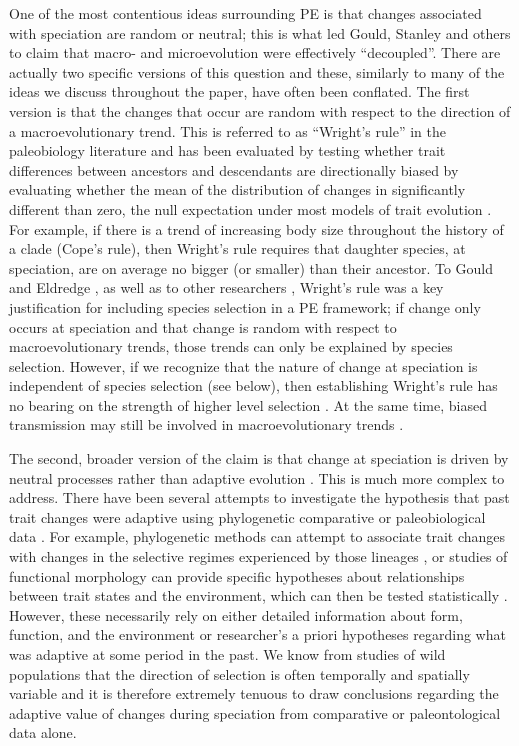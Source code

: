 One of the most contentious ideas surrounding PE is that changes associated with speciation are random or neutral; this is what led Gould, Stanley and others to claim that macro- and microevolution were effectively ``decoupled''. There are actually two specific versions of this question and these, similarly to many of the ideas we discuss throughout the paper, have often been conflated. The first version is that the changes that occur are random with respect to the direction of a macroevolutionary trend. This is referred to as ``Wright's rule'' in the paleobiology literature \citep{GouldEldredge1977} and has been evaluated by testing whether trait differences between ancestors and descendants are directionally biased by evaluating whether the mean of the distribution of changes in significantly different than zero, the null expectation under most models of trait evolution \citep{Wagner1996, Wagner2001}. For example, if there is a trend of increasing body size throughout the history of a clade (Cope's rule), then Wright's rule requires that daughter species, at speciation, are on average no bigger (or smaller) than their ancestor. To Gould and Eldredge \citeyearpar{GouldEldredge1977}, as well as to other researchers \citep[for example,][]{Stanley1975, Stanley1979}, Wright's rule was a key justification for including species selection in a PE framework; if change only occurs at speciation and that change is random with respect to macroevolutionary trends, those trends can only be explained by species selection. However, if we recognize that the nature of change at speciation is independent of species selection (see below), then establishing Wright's rule has no bearing on the strength of higher level selection \citep{Simpson2013}. At the same time, biased transmission may still be involved in macroevolutionary trends \citep{Wagner1996, McShea1994, McShea1998}.

The second, broader version of the claim is that change at speciation is driven by neutral processes rather than adaptive evolution \citep{Stanley1979, Gould1980, Gould2002}. This is much more complex to address. There have been several attempts to investigate the hypothesis that past trait changes were adaptive using phylogenetic comparative or paleobiological data  \citep[see for example,][]{Adaptation}. For example, phylogenetic methods can attempt to associate trait changes with changes in the selective regimes experienced by those lineages \citep{Baum1991, ButlerKing2004, Beaulieu2012}, or studies of functional morphology can provide specific hypotheses about relationships between trait states and the environment, which can then be tested statistically \citep{Wainwright2007}. However, these necessarily rely on either detailed information about form, function, and the environment \citep[e.g.,][and references therein]{Vermeij1987} or researcher's a priori hypotheses regarding what was adaptive at some period in the past. We know from studies of wild populations that the direction of selection is often temporally and spatially variable \citep{Grant2002, Siepielski2009, Siepielski2011} and it is therefore extremely tenuous to draw conclusions regarding the adaptive value of changes during speciation from comparative or paleontological data alone.

